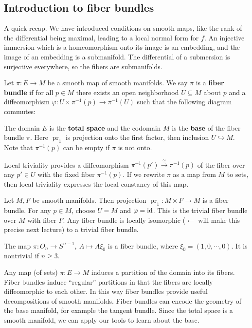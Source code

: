 \subsection{Introduction to fiber bundles}
A quick recap. We have introduced conditions on smooth maps, like the rank of the differential being maximal, leading to a local normal form for $f$. An injective immersion which is a homeomorphism onto its image is an embedding, and the image of an embedding is a submanifold. The differential of a submersion is surjective everywhere, so the fibers are submanifolds.
\begin{definition}[]
    Let $\pi \colon E \to M$ be a smooth map of smooth manifolds. We say $\pi$ is a \textbf{fiber bundle} if for all $p \in M$ there exists an open neighborhood $U \subseteq M$ about $p$ and a diffeomorphism $\varphi \colon U\times \pi^{-1}(p) \to \pi^{-1}(U)$ such that the following diagram commutes:
    \begin{figure}[H]
    \centering
    \end{figure}
    The domain $E$ is the \textbf{total space} and the codomain $M$ is the \textbf{base} of the fiber bundle $\pi$. Here $\operatorname{pr}_1$ is projection onto the first factor, then inclusion $U \hookrightarrow M$. Note that $\pi ^{-1}(p)$ can be empty if $\pi$ is not onto.
\end{definition}
\begin{remark}
    Local triviality provides a diffeomorphism $\pi ^{-1}(p') \overset{\cong}{\longrightarrow} \pi ^{-1}(p)$ of the fiber over any $p'\in U$ with the fixed fiber $\pi ^{-1}(p)$. If we rewrite $\pi$ as a map from $M$ to sets, then local triviality expresses the local constancy of this map.
\end{remark}
\begin{example}
    Let $M,F$ be smooth manifolds. Then projection $\operatorname{pr}_1 \colon M\times F \to M$ is a fiber bundle. For any $p \in M$, choose $U=M$ and $\varphi =\operatorname{id}$. This is the trivial fiber bundle over $M$ with fiber $F$. Any fiber bundle is locally isomorphic ($\leftarrow$ will make this precise next lecture) to a trivial fiber bundle.
\end{example}
\begin{example}
    The map $\pi \colon O_n  \to S^{n-1}, \ A \mapsto A \xi_0$ is a fiber bundle, where $\xi_0=(1,0,\cdots ,0)$. It is nontrivial if $n\geq 3$.
\end{example}
Any map (of sets) $\pi \colon E \to M$ induces a partition of the domain into its fibers. Fiber bundles induce ``regular'' partitions in that the fibers are locally diffeomorphic to each other. In this way fiber bundles provide useful decompositions of smooth manifolds. Fiber bundles can encode the geometry of the base manifold, for example the tangent bundle. Since the total space is a smooth manifold, we can apply our tools to learn about the base.

